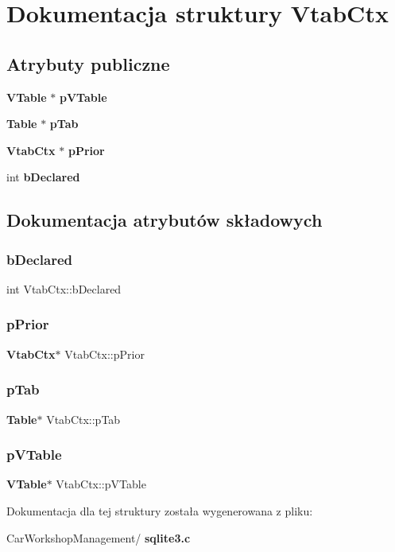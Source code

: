 \section{Dokumentacja struktury Vtab\+Ctx}
\label{struct_vtab_ctx}
\subsection*{Atrybuty publiczne}
\begin{DoxyCompactItemize}
\item 
\textbf{ V\+Table} $\ast$ \textbf{ p\+V\+Table}
\item 
\textbf{ Table} $\ast$ \textbf{ p\+Tab}
\item 
\textbf{ Vtab\+Ctx} $\ast$ \textbf{ p\+Prior}
\item 
int \textbf{ b\+Declared}
\end{DoxyCompactItemize}


\subsection{Dokumentacja atrybutów składowych}
\mbox{\label{struct_vtab_ctx_a3e4936f41e9dc9a8ee37f35b9aec90d8}} 
\subsubsection{bDeclared}
{\footnotesize\ttfamily int Vtab\+Ctx\+::b\+Declared}

\mbox{\label{struct_vtab_ctx_a0100b21d6b04d3b7565f1315b9008385}} 
\subsubsection{pPrior}
{\footnotesize\ttfamily \textbf{ Vtab\+Ctx}$\ast$ Vtab\+Ctx\+::p\+Prior}

\mbox{\label{struct_vtab_ctx_a4040cb18a83afebad0ad7e7f20572b09}} 
\subsubsection{pTab}
{\footnotesize\ttfamily \textbf{ Table}$\ast$ Vtab\+Ctx\+::p\+Tab}

\mbox{\label{struct_vtab_ctx_a99bbe533ea0423138d7dddba5aa662b8}} 
\subsubsection{pVTable}
{\footnotesize\ttfamily \textbf{ V\+Table}$\ast$ Vtab\+Ctx\+::p\+V\+Table}



Dokumentacja dla tej struktury została wygenerowana z pliku\+:\begin{DoxyCompactItemize}
\item 
Car\+Workshop\+Management/\textbf{ sqlite3.\+c}\end{DoxyCompactItemize}
